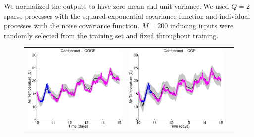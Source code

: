 We normalized the outputs to have zero mean and unit variance.
We used $Q = 2$ sparse processes with the squared exponential covariance function and individual processes with the noise covariance function.
$M=200$  inducing inputs  were randomly selected from the training set and fixed throughout training.
%
\begin{figure}
\centering
\begin{tabular}{ccc}
\includegraphics[scale=0.3]{figures/cogp-weatherCambermet.eps} &
\includegraphics[scale=0.3]{figures/cgp-weatherCambermet.eps} &

\end{tabular}
\end{figure}
